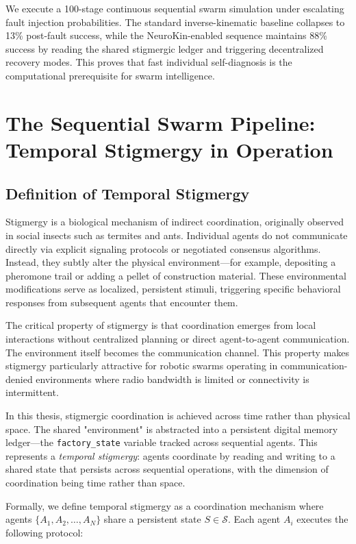 \documentclass[12pt,a4paper,oneside]{report}
\begin{document}
We execute a 100-stage continuous sequential swarm simulation under escalating fault injection probabilities. The standard inverse-kinematic baseline collapses to 13\% post-fault success, while the NeuroKin-enabled sequence maintains 88\% success by reading the shared stigmergic ledger and triggering decentralized recovery modes. This proves that fast individual self-diagnosis is the computational prerequisite for swarm intelligence.

\section{The Sequential Swarm Pipeline: Temporal Stigmergy in Operation}

\subsection{Definition of Temporal Stigmergy}
\label{subsec:definition_of_temporal_stigmergy}

Stigmergy is a biological mechanism of indirect coordination, originally observed in social insects such as termites and ants. Individual agents do not communicate directly via explicit signaling protocols or negotiated consensus algorithms. Instead, they subtly alter the physical environment—for example, depositing a pheromone trail or adding a pellet of construction material. These environmental modifications serve as localized, persistent stimuli, triggering specific behavioral responses from subsequent agents that encounter them.

The critical property of stigmergy is that coordination emerges from local interactions without centralized planning or direct agent-to-agent communication. The environment itself becomes the communication channel. This property makes stigmergy particularly attractive for robotic swarms operating in communication-denied environments where radio bandwidth is limited or connectivity is intermittent.

In this thesis, stigmergic coordination is achieved across time rather than physical space. The shared "environment" is abstracted into a persistent digital memory ledger—the \texttt{factory\_state} variable tracked across sequential agents. This represents a \textit{temporal stigmergy}: agents coordinate by reading and writing to a shared state that persists across sequential operations, with the dimension of coordination being time rather than space.

Formally, we define temporal stigmergy as a coordination mechanism where agents $\{A_1, A_2, \ldots, A_N\}$ share a persistent state $S \in \mathcal{S}$. Each agent $A_i$ executes the following protocol:
\end{document}
